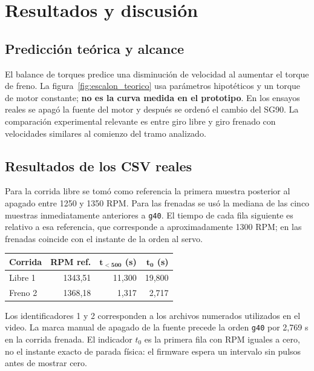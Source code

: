 \documentclass[9pt,a4paper,twocolumn]{extarticle}
\begin{document}
\section{Resultados y discusión}\label{resultados-y-discusiuxf3n}

\subsection{Predicción teórica y alcance}

El balance de torques predice una disminución de velocidad al aumentar
el torque de freno. La figura~\ref{fig:escalon_teorico} usa parámetros
hipotéticos y un torque de motor constante; \textbf{no es la curva
medida en el prototipo}. En los ensayos reales se apagó la fuente
del motor y después se ordenó el cambio del SG90. La comparación
experimental relevante es entre giro libre y giro frenado con
velocidades similares al comienzo del tramo analizado.

\subsection{Resultados de los CSV reales}

Para la corrida libre se tomó como referencia la primera muestra
posterior al apagado entre 1250 y 1350 RPM. Para las frenadas se usó
la mediana de las cinco muestras inmediatamente anteriores a
\texttt{g40}. El tiempo de cada fila siguiente es relativo a esa
referencia, que corresponde a aproximadamente 1300 RPM; en las
frenadas coincide con el instante de la orden al servo.

\begin{center}\begingroup\footnotesize\setlength{\tabcolsep}{4pt}
\begin{tabular}{@{}lrrr@{}}
\toprule
\textbf{Corrida} & \textbf{RPM ref.} &
\(\boldsymbol{t_{<500}}\) \textbf{(s)} &
\(\boldsymbol{t_{0}}\) \textbf{(s)}\\
\midrule
Libre 1 & 1343,51 & 11,300 & 19,800\\
Freno 2 & 1368,18 & 1,317 & 2,717\\
\bottomrule
\end{tabular}\endgroup\end{center}

Los identificadores 1 y 2 corresponden a los archivos numerados
utilizados en el video. La marca manual de apagado de la fuente
precede la orden \texttt{g40} por 2,769 s en la corrida frenada.
El indicador
\(t_0\) es la primera fila con RPM iguales a cero, no el instante
exacto de parada física: el firmware espera un intervalo sin
pulsos antes de mostrar cero.
\end{document}
